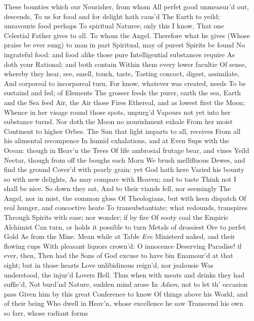 \documentclass[11pt]{book}
\newcounter {first}
\begin{document}
These bounties which our Nourisher, from whom 
All perfet good unmeasur'd out, descends, 
To us for food and for delight hath caus'd 
The Earth to yeild; unsavourie food perhaps 
To spiritual Natures; only this I know, 
That one Celestial Father gives to all. 
\quad To whom the Angel.  Therefore what he gives 
(Whose praise be ever sung) to man in part 
Spiritual, may of purest Spirits be found 
No ingrateful food: and food alike those pure 
Intelligential substances require 
As doth your Rational; and both contain 
Within them every lower facultie 
Of sense, whereby they hear, see, smell, touch, taste, 
Tasting concoct, digest, assimilate, 
And corporeal to incorporeal turn. 
For know, whatever was created, needs 
To be sustaind and fed; of Elements 
The grosser feeds the purer, earth the sea, 
Earth and the Sea feed Air, the Air those Fires 
Ethereal, and as lowest first the Moon; 
Whence in her visage round those spots, unpurg'd 
Vapours not yet into her substance turnd. 
Nor doth the Moon no nourishment exhale 
From her moist Continent to higher Orbes. 
The Sun that light imparts to all, receives 
From all his alimental recompence 
In humid exhalations, and at Even 
Sups with the Ocean: though in Heav'n the Trees 
Of life ambrosial frutage bear, and vines 
Yeild Nectar, though from off the boughs each Morn 
We brush mellifluous Dewes, and find the ground 
Cover'd with pearly grain: yet God hath here 
Varied his bounty so with new delights, 
As may compare with Heaven; and to taste 
Think not I shall be nice.  So down they sat, 
And to their viands fell, nor seemingly 
The Angel, nor in mist, the common gloss 
Of Theologians, but with keen dispatch 
Of real hunger, and concoctive heate 
To transubstantiate; what redounds, transpires 
Through Spirits with ease; nor wonder; if by fire 
Of sooty coal the Empiric Alchimist 
Can turn, or holds it possible to turn 
Metals of drossiest Ore to perfet Gold 
As from the Mine.  Mean while at Table \textit{Eve} 
Ministerd naked, and their flowing cups 
With pleasant liquors crown'd: O innocence 
Deserving Paradise! if ever, then, 
Then had the Sons of God excuse to have bin 
Enamour'd at that sight; but in those hearts 
Love unlibidinous reign'd, nor jealousie 
Was understood, the injur'd Lovers Hell. 
\quad Thus when with meats and drinks they had suffic'd, 
Not burd'nd Nature, sudden mind arose 
In \textit{Adam}, not to let th' occasion pass 
Given him by this great Conference to know 
Of things above his World, and of their being 
Who dwell in Heav'n, whose excellence he saw 
Transcend his own so farr, whose radiant forms 
\end{document}
